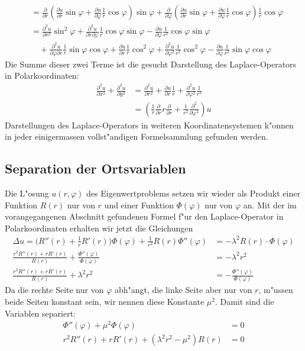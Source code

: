 \begin{align*}
&=
\frac{\partial}{\partial r}
\left(
\frac{\partial u}{\partial r}
\sin\varphi
+
\frac{\partial u}{\partial\varphi}
\frac1r\cos\varphi
\right)
\sin\varphi
+
\frac{\partial}{\partial \varphi}
\left(
\frac{\partial u}{\partial r}
\sin\varphi
+
\frac{\partial u}{\partial\varphi}
\frac1r\cos\varphi
\right)
\frac1r\cos\varphi
\\
&=
\frac{\partial^2u}{\partial r^2}\sin^2\varphi
+\frac{\partial^2u}{\partial r\partial\varphi}\frac1r\cos\varphi\sin\varphi
-\frac{\partial u}{\partial\varphi}\frac1{r^2}\cos\varphi\sin\varphi
\\
&\quad
+
\frac{\partial^2u}{\partial\varphi\partial r}\frac1r\sin\varphi\cos\varphi
+\frac{\partial u}{\partial r}\frac1r\cos^2\varphi
+\frac{\partial^2u}{\partial \varphi^2}\frac1{r^2}\cos^2\varphi
-\frac{\partial u}{\partial \varphi}\frac1{r^2}\sin\varphi\cos\varphi
\end{align*}
Die Summe dieser zwei Terme ist die gesucht Darstellung des Laplace-Operators
in Polarkoordinaten:
\begin{align*}
\frac{\partial^2u}{\partial x^2}+\frac{\partial^2u}{\partial y^2}
&=
\frac{\partial^2u}{\partial r^2}
+\frac{\partial u}{\partial r}\frac1r
+\frac{\partial^2u}{\partial\varphi^2}\frac1{r^2}
\\
&=
\left(\frac1r\frac{\partial}{\partial r}r\frac{\partial}{\partial r}+\frac1{r^2}\frac{\partial^2}{\partial \varphi^2}\right)u
\end{align*}
Darstellungen des Laplace-Operators in weiteren Koordinatensystemen k"onnen
in jeder einigermassen vollst"andigen Formelsammlung gefunden werden.

\subsection{Separation der Ortsvariablen}
Die L"osung $u(r,\varphi)$ des Eigenwertproblems setzen wir wieder
als Produkt einer Funktion
$R(r)$
nur von  $r$ und einer Funktion $\Phi(\varphi)$ nur von $\varphi$ an.
Mit der im vorangegangenen Abschnitt gefundenen Formel f"ur den Laplace-Operator
in Polarkoordinaten erhalten wir jetzt die Gleichungen
\begin{align*}
\Delta u=
\biggl(R''(r) + \frac1rR'(r)\biggr)\Phi(\varphi)
+\frac1{r^2}R(r)\Phi''(\varphi)&=-\lambda^2 R(r)\cdot\Phi(\varphi)\\
\frac{r^2R''(r)+rR'(r)}{R(r)}+\frac{\Phi''(\varphi)}{\Phi(\varphi)}
&=-\lambda^2 r^2
\\
\frac{r^2R''(r)+rR'(r)}{R(r)}+\lambda^2 r^2&=-\frac{\Phi''(\varphi)}{\Phi(\varphi)}
\end{align*}
Da die rechte Seite nur von $\varphi$ abh"angt, die linke Seite aber nur von $r$,
m"ussen beide Seiten konstant sein, wir nennen diese Konstante $\mu^2$.
Damit sind die Variablen separiert:
\begin{align}
\Phi''(\varphi)+\mu^2\Phi(\varphi)&=0\label{phigleichung}\\
r^2R''(r)+rR'(r)+(\lambda^2 r^2-\mu^2)R(r)&=0\label{rgleichung}
\end{align}

